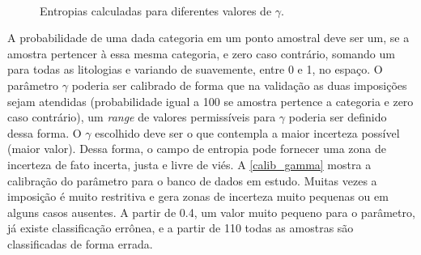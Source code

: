 \begin{figure}[H]
\caption{Entropias calculadas para diferentes valores de $\gamma$.} 
\label{entro_gamma}
\begin{center}
\\
\end{center}
\begin{center}
\end{center}
\end{figure}

A probabilidade de uma dada categoria em um ponto amostral deve ser um, se a amostra pertencer à essa mesma categoria, e zero caso contrário, somando um para todas as litologias e variando de suavemente, entre 0 e 1, no espaço. O parâmetro $\gamma$ poderia ser calibrado de forma que na validação as duas imposições sejam atendidas (probabilidade igual a 100 se amostra pertence a categoria e zero caso contrário), um \textit{range} de valores permissíveis para $\gamma$ poderia ser definido dessa forma. O $\gamma$ escolhido deve ser o que contempla a maior incerteza possível (maior valor). Dessa forma, o campo de entropia pode fornecer uma zona de incerteza de fato incerta, justa e livre de viés. A \autoref{calib_gamma} mostra a calibração do parâmetro para o banco de dados em estudo. Muitas vezes a imposição é muito restritiva e gera zonas de incerteza muito pequenas ou em alguns casos ausentes. A partir de 0.4, um valor muito pequeno para o parâmetro, já existe classificação errônea, e a partir de 110 todas as amostras são classificadas de forma errada.

